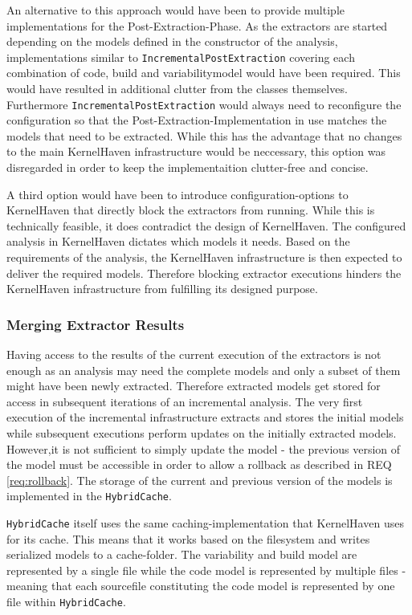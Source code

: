 \documentclass[a4paper]{article}
\begin{document}
An alternative to this approach would have been to provide multiple implementations for the Post-Extraction-Phase. As the extractors are started depending on the models defined in the constructor of the analysis, implementations similar to \texttt{Incremental\-Post\-Extraction} covering each combination of code, build and variabilitymodel would have been required. This would have resulted in additional clutter from the classes themselves. Furthermore \texttt{Incremental\-Post\-Extraction} would always need to reconfigure the configuration so that the Post-Extraction-Implementation in use matches the models that need to be extracted. While this has the advantage that no changes to the main KernelHaven infrastructure would be neccessary, this option was disregarded in order to keep the implementaition clutter-free and concise.

A third option would have been to introduce configuration-options to KernelHaven that directly block the extractors from running. While this is technically feasible, it does contradict the design of KernelHaven. The configured analysis in KernelHaven dictates which models it needs. Based on the requirements of the analysis, the KernelHaven infrastructure is then expected to deliver the required models.  Therefore blocking extractor executions hinders the KernelHaven infrastructure from fulfilling its designed purpose. 

\subsubsection{Merging Extractor Results}

Having access to the results of the current execution of the extractors is not enough as an analysis may need the complete models and only a subset of them might have been newly extracted. Therefore extracted models get stored for access in subsequent iterations of an incremental analysis. The very first execution of the incremental infrastructure extracts and stores the initial models while subsequent executions perform updates on the initially extracted models. However,it is not sufficient to simply update the model - the previous version of the model must be accessible in order to allow a rollback as described in REQ \ref{req:rollback}. The storage of the current and previous version of the models is implemented in the \texttt{Hybrid\-Cache}.

\texttt{Hybrid\-Cache} itself uses the same caching-implementation that KernelHaven uses for its cache. This means that it works based on the filesystem and writes serialized models to a cache-folder. The variability and build model are represented by a single file while the code model is represented by multiple files - meaning that each sourcefile constituting the code model is represented by one file within \texttt{Hybrid\-Cache}.
 
\end{document}
